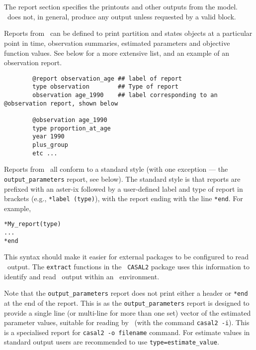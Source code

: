 \section{\label{sec:report-section}}
The report section specifies the printouts and other outputs from the model. \CNAME\ does not, in general, produce any output unless requested by a valid  block. 

Reports from \CNAME\ can be defined to print partition and states objects at a particular point in time, observation summaries, estimated parameters and objective function values. See below for a more extensive list, and an example of an observation report.

{\small{\begin{verbatim}
		@report observation_age ## label of report
		type observation		## Type of report
		observation age_1990	## label corresponding to an @observation report, shown below
		
		@observation age_1990
		type proportion_at_age
		year 1990
		plus_group
		etc ...
		\end{verbatim}}}

Reports from \CNAME\ all conform to a standard style (with one exception --- the \texttt{output\_parameters} report, see below). The standard style is that reports are prefixed with an aster-ix followed by a user-defined label and type of report in brackets (e.g., \texttt{*label (type)}), with the report ending with the line \texttt{*end}. For example,

\begin{verbatim} 
*My_report(type)
...
*end
\end{verbatim}


This syntax should make it easier for external packages to be configured to read \CNAME\ output. The \texttt{extract} functions in the \R\ \texttt{CASAL2} package uses this information to identify and read \CNAME\ output within an \R\ environment.

Note that the \texttt{output\_parameters} report does not print either a header or \texttt{*end} at the end of the report. This is as the \texttt{output\_parameters} report is designed to provide a single line (or multi-line for more than one set) vector of the estimated parameter values, suitable for reading by \CNAME\ (with the command \texttt{casal2 -i}). This is a specialised report for \texttt{casal2 -o filename} command. For estimate values in standard output users are recommended to use \texttt{type=estimate\_value}.

